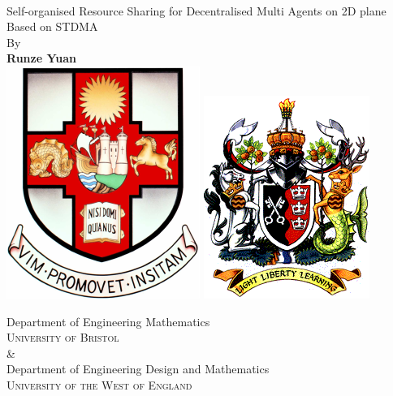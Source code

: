 \documentclass[12pt, oneside]{article}
\begin{document}
\begin{titlepage}
    \begin{center}
        \vspace*{1cm}
        {\huges
        }
         \\
         \vspace{0.3cm}
         \large{Self-organised Resource Sharing for Decentralised Multi Agents on 2D plane Based on STDMA}
         \vspace{0.5cm}
        \\
        {\large By}
        \\
        \vspace{0.5cm}
        \textbf{Runze Yuan}
   		\vspace{1.5cm}
        \\
        \vspace{0.25cm}
       \includegraphics[scale=0.6]{logos/bristolcrest_colour.pdf}
        \hspace{5mm}
        \includegraphics[scale=0.35]{logos/UWE_insignia.png}

        \vspace{10mm}
        {\large Department of Engineering Mathematics\\
        \textsc{University of Bristol}}
        \\
        \&
        \\
        {\large Department of Engineering Design and Mathematics\\
        \textsc{University of the West of England}}\\


\end{center}
\end{titlepage}
\end{document}

